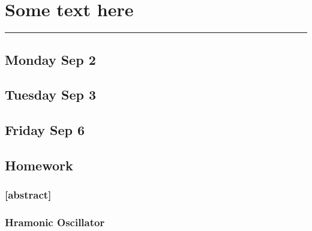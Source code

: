 \section{Some text here}
\vspace{-15pt}\noindent\rule{\textwidth}{0.1pt}\vspace{-10pt}
    \subsection{\hfill \small Monday Sep 2}
    \subsection{\hfill\small Tuesday Sep 3}
    \subsection{\hfill \small Friday Sep 6}
    \subsection*{Homework}
        \subsubsection*{[abstract]}
        \subsubsection{Hramonic Oscillator}
